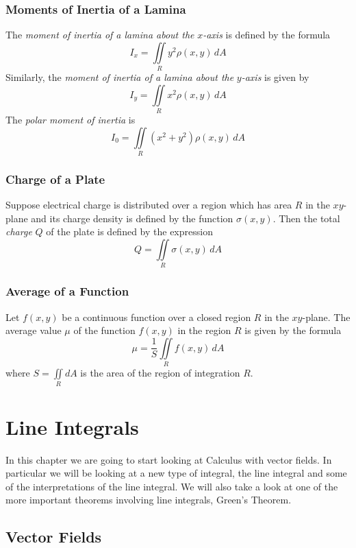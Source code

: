 \documentclass[10pt,reqno]{book}
\theoremstyle{definition}
\begin{document}
	\subsection*{Moments of Inertia of a Lamina}
	
	The \textit{moment of inertia of a lamina about the} $ x $\textit{-axis} is defined by the formula
	\[ I_x = \iint\limits_R y^2 \rho(x,y) \,dA \]
	Similarly, the \textit{moment of inertia of a lamina about the} $ y $\textit{-axis} is given by
	\[ I_y = \iint\limits_R x^2 \rho(x,y)\,dA \]
	The \textit{polar moment of inertia} is
	\[ I_0 = \iint\limits_R (x^2 + y^2) \rho(x,y)\,dA \]
	
	\subsection*{Charge of a Plate}
	
	Suppose electrical charge is distributed over a region which has area $ R $ in the $ xy $-plane and its charge density is defined by the function $ \sigma(x,y) $. Then the total \textit{charge} $ Q $ of the plate is defined by the expression
	\[ Q = \iint\limits_R \sigma(x,y)\,dA \]
	
	\subsection*{Average of a Function}
	
	Let $ f(x,y) $ be a continuous function over a closed region $ R $ in the $ xy $-plane. The average value $ \mu $ of the function $ f(x,y) $ in the region $ R $ is given by the formula
	\[ \mu = \frac{1}{S} \iint\limits_R f(x,y)\,dA \]
	where $ S = \iint\limits_R dA $ is the area of the region of integration $ R $.
	
	
	
	\chapter{Line Integrals}
	
	In this chapter we are going to start looking at Calculus with vector fields. In particular we will be looking at a new type of integral, the line integral and some of the interpretations of the line integral. We will also take a look at one of the more important theorems involving line integrals, Green's Theorem.
	
	\section{Vector Fields}
	
\end{document}
